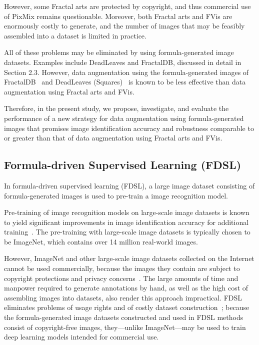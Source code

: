 However, some Fractal arts are protected by
copyright, and thus commercial use of PixMix
remains questionable.
Moreover, both Fractal arts and FVis are enormously
costly to generate, and the number of images
that may be feasibly assembled into a dataset
is limited in practice.

All of these problems may be eliminated by using
formula-generated image datasets. Examples include
DeadLeaves and FractalDB, discussed in detail in Section 2.3.
However, data augmentation using the formula-generated images
of FractalDB~\cite{FractalDB} and DeadLeaves (Squares)~\cite{DeadLeaves}
is known to be less effective than data augmentation
using Fractal arts and FVis.

Therefore, in the present study, we propose, investigate, and
evaluate the performance of a new strategy for
data augmentation using formula-generated images
that promises image identification accuracy and robustness
comparable to or greater than that of data augmentation
using Fractal arts and FVis.



\subsection{Formula-driven Supervised Learning (FDSL)}
\label{sec:FDSL}

In formula-driven supervised learning (FDSL),
a large image dataset consisting of formula-generated images
is used to pre-train a image recognition model.

Pre-training of image recognition models on large-scale image datasets
is known to yield significant improvements in image identification accuracy
for additional training~\cite{DeCAF,wmi,dbi}.
The pre-training with large-scale image datasets is typically chosen to be ImageNet, which contains over 14 million real-world images.

However, ImageNet and other large-scale image datasets collected on the Internet
cannot be used commercially, because the images they
contain are subject to copyright protections and
privacy concerns~\cite{ImageNet,Gender,Fairer}.
The large amounts of time and manpower required to
generate annotations by hand, as well as the high cost of
assembling images into datasets, also render this approach impractical.
FDSL eliminates problems of usage rights
and of costly dataset construction~\cite{FractalDB};
because the formula-generated image datasets constructed
and used in FDSL methods consist of copyright-free
images, they---unlike ImageNet---may be used to train deep learning
models intended for commercial use.

